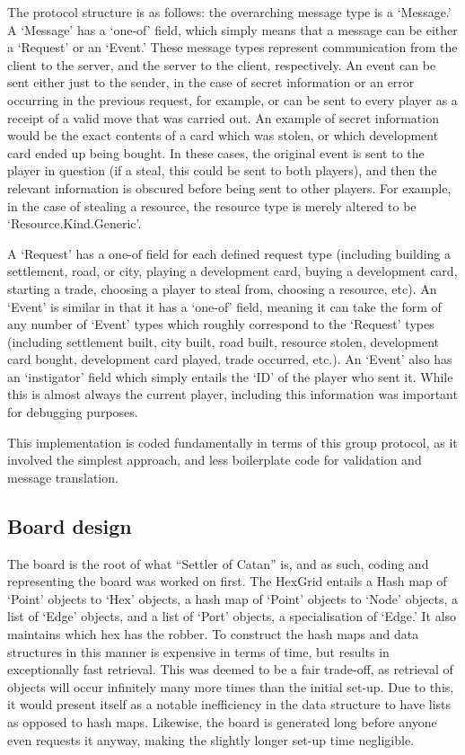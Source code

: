 \documentclass[a4paper,doc,draftfirst]{apa6}
\begin{document}
The protocol structure is as follows: the overarching message type is a ‘Message.’ A ‘Message’ has a ‘one-of’ field, which simply means that a message can be either a ‘Request’ or an ‘Event.’ These message types represent communication from the client to the server, and the server to the client, respectively. An event can be sent either just to the sender, in the case of secret information or an error occurring in the previous request, for example, or can be sent to every player as a receipt of a valid move that was carried out. An example of secret information would be the exact contents of a card which was stolen, or which development card ended up being bought. In these cases, the original event is sent to the player in question (if a steal, this could be sent to both players), and then the relevant information is obscured before being sent to other players. For example, in the case of stealing a resource, the resource type is merely altered to be ‘Resource.Kind.Generic’.

A ‘Request’ has a one-of field for each defined request type (including building a settlement, road, or city, playing a development card, buying a development card, starting a trade, choosing a player to steal from, choosing a resource, etc). An ‘Event’ is similar in that it has a ‘one-of’ field, meaning it can take the form of any number of ‘Event’ types which roughly correspond to the ‘Request’ types (including settlement built, city built, road built, resource stolen, development card bought, development card played, trade occurred, etc.). An ‘Event’ also has an ‘instigator’ field which simply entails the ‘ID’ of the player who sent it. While this is almost always the current player, including this information was important for debugging purposes.

This implementation is coded fundamentally in terms of this group protocol, as it involved the simplest approach, and less boilerplate code for validation and message translation.

\subsection{Board design}
The board is the root of what “Settler of Catan” is, and as such, coding and representing the board was worked on first. The HexGrid entails a Hash map of ‘Point’ objects to ‘Hex’ objects, a hash map of ‘Point’ objects to ‘Node’ objects, a list of ‘Edge’ objects, and a list of ‘Port’ objects, a specialisation of ‘Edge.’ It also maintains which hex has the robber. To construct the hash maps and data structures in this manner is expensive in terms of time, but results in exceptionally fast retrieval. This was deemed to be a fair trade-off, as retrieval of objects will occur infinitely many more times than the initial set-up. Due to this, it would present itself as a notable inefficiency in the data structure to have lists as opposed to hash maps. Likewise, the board is generated long before anyone even requests it anyway, making the slightly longer set-up time negligible.
\end{document}
